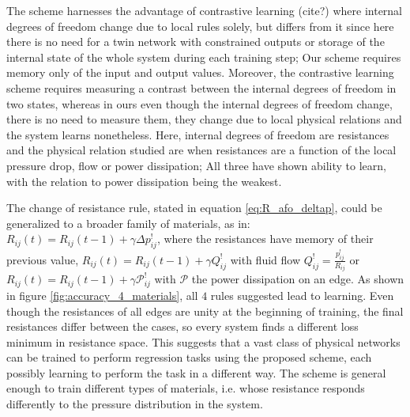 \documentclass[%
 reprint,
 amsmath,amssymb,
 aps,
]{revtex4-2}
\begin{document}
    The scheme harnesses the advantage of contrastive learning (cite?) where internal degrees of freedom change due to local rules solely, but differs from it since here there is no need for a twin network with constrained outputs or storage of the internal state of the whole system during each training step; Our scheme requires memory only of the input and output values. Moreover, the contrastive learning scheme requires measuring a contrast between the internal degrees of freedom in two states, whereas in ours even though the internal degrees of freedom change, there is no need to measure them, they change due to local physical relations and the system learns nonetheless. Here, internal degrees of freedom are resistances and the physical relation studied are when resistances are a function of the local pressure drop, flow or power dissipation; All three have shown ability to learn, with the relation to power dissipation being the weakest.
    
    The change of resistance rule, stated in equation \ref{eq:R_afo_deltap}, could be generalized to a broader family of materials, as in: $R_{ij}\left(t\right)=R_{ij}\left(t-1\right) + \gamma \Delta p^!_{ij}$, where the resistances have memory of their previous value, $R_{ij}\left(t\right) = R_{ij}\left(t-1\right) + \gamma Q^!_{ij}$ with fluid flow $Q^!_{ij}=\frac{p^!_{ij}}{R_{ij}}$ or $R_{ij}\left(t\right)=R_{ij}\left(t-1\right) + \gamma \mathcal{P}^!_{ij}$ with $\mathcal{P}$ the power dissipation on an edge. As shown in figure \ref{fig:accuracy_4_materials}, all $4$ rules suggested lead to learning. Even though the resistances of all edges are unity at the beginning of training, the final resistances differ between the cases, so every system finds a different loss minimum in resistance space. This suggests that a vast class of physical networks can be trained to perform regression tasks using the proposed scheme, each possibly learning to perform the task in a different way. The scheme is general enough to train different types of materials, i.e. whose resistance responds differently to the pressure distribution in the system.
\end{document}
